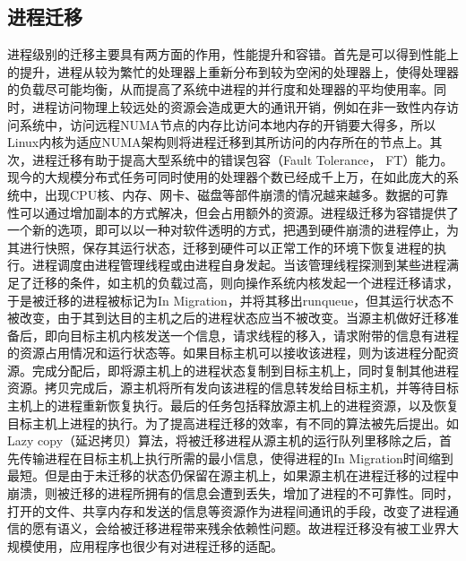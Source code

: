 \subsection{进程迁移}
进程级别的迁移主要具有两方面的作用，性能提升和容错\cite{processmigration}。首先是可以得到性能上的提升，进程从较为繁忙的处理器上重新分布到较为空闲的处理器上，使得处理器的负载尽可能均衡，从而提高了系统中进程的并行度和处理器的平均使用率。同时，进程访问物理上较远处的资源会造成更大的通讯开销，例如在非一致性内存访问系统中，访问远程NUMA节点的内存比访问本地内存的开销要大得多，所以Linux内核为适应NUMA架构则将进程迁移到其所访问的内存所在的节点上。其次，进程迁移有助于提高大型系统中的错误包容（Fault Tolerance， FT）能力。现今的大规模分布式任务可同时使用的处理器个数已经成千上万，在如此庞大的系统中，出现CPU核、内存、网卡、磁盘等部件崩溃的情况越来越多。数据的可靠性可以通过增加副本的方式解决，但会占用额外的资源。进程级迁移为容错提供了一个新的选项，即可以以一种对软件透明的方式，把遇到硬件崩溃的进程停止，为其进行快照，保存其运行状态，迁移到硬件可以正常工作的环境下恢复进程的执行。进程调度由进程管理线程或由进程自身发起。当该管理线程探测到某些进程满足了迁移的条件，如主机的负载过高，则向操作系统内核发起一个进程迁移请求，于是被迁移的进程被标记为In Migration，并将其移出runqueue，但其运行状态不被改变，由于其到达目的主机之后的进程状态应当不被改变。当源主机做好迁移准备后，即向目标主机内核发送一个信息，请求线程的移入，请求附带的信息有进程的资源占用情况和运行状态等。如果目标主机可以接收该进程，则为该进程分配资源。完成分配后，即将源主机上的进程状态复制到目标主机上，同时复制其他进程资源。拷贝完成后，源主机将所有发向该进程的信息转发给目标主机，并等待目标主机上的进程重新恢复执行。最后的任务包括释放源主机上的进程资源，以及恢复目标主机上进程的执行。为了提高进程迁移的效率，有不同的算法被先后提出\cite{migrationppt}。如Lazy copy（延迟拷贝）算法，将被迁移进程从源主机的运行队列里移除之后，首先传输进程在目标主机上执行所需的最小信息，使得进程的In Migration时间缩到最短。但是由于未迁移的状态仍保留在源主机上，如果源主机在进程迁移的过程中崩溃，则被迁移的进程所拥有的信息会遭到丢失，增加了进程的不可靠性。同时，打开的文件、共享内存和发送的信息等资源作为进程间通讯的手段，改变了进程通信的愿有语义，会给被迁移进程带来残余依赖性问题。故进程迁移没有被工业界大规模使用，应用程序也很少有对进程迁移的适配。
